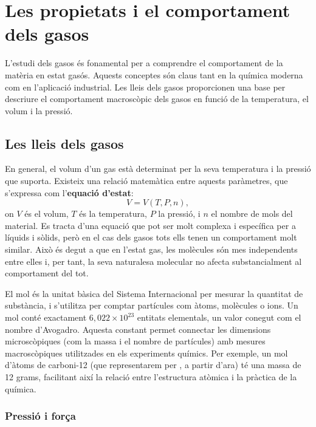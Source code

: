 \chapter{Les propietats i el comportament dels gasos}

L'estudi dels gasos és fonamental per a comprendre el comportament de la matèria en estat gasós. Aquests conceptes són claus tant en la química moderna com en l'aplicació industrial. Les lleis dels gasos proporcionen una base per descriure el comportament macroscòpic dels gasos en funció de la temperatura, el volum i la pressió.



\section{Les lleis dels gasos}
En general, el volum d'un gas està determinat per la seva temperatura i la pressió que suporta. Existeix una relació matemàtica entre aquests paràmetres, que s'expressa com l'\textbf{equació d'estat}:
\begin{equation}
V = V(T, P, n),
\end{equation}
on $V$ és el volum, $T$ és la temperatura, $P$ la pressió, i $n$ el nombre de mols del material. Es tracta d'una equació que pot ser molt complexa i específica per a líquids i sòlids, però en el cas dels gasos tots ells tenen un comportament molt similar. Això és degut a que en l'estat gas, les molècules són mes independents entre elles i, per tant, la seva naturalesa molecular no afecta substancialment al comportament del tot.

\begin{mybox}[title=De partícules i mols de partícules]
    El mol és la unitat bàsica del Sistema Internacional per mesurar la quantitat de substància, i s'utilitza per comptar partícules com àtoms, molècules o ions. Un mol conté exactament \(6,022 \times 10^{23}\) entitats elementals, un valor conegut com el nombre d'Avogadro. Aquesta constant permet connectar les dimensions microscòpiques (com la massa i el nombre de partícules) amb mesures macroscòpiques utilitzades en els experiments químics. Per exemple, un mol d'àtoms de carboni-12 (que representarem per , a partir d'ara) té una massa de 12 grams, facilitant així la relació entre l'estructura atòmica i la pràctica de la química.
\end{mybox}
    
\subsection{Pressió i força}

